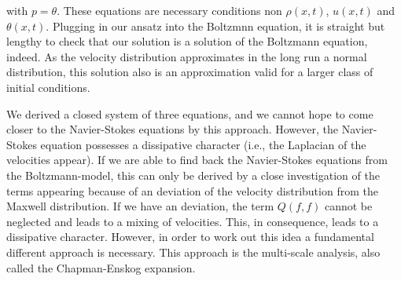 with $p = \theta$. 
 These equations
are necessary conditions non $\rho(x,t)$, $u(x,t)$ and $\theta(x,t)$. Plugging in our ansatz into the Boltzmnn equation, 
it is straight but lengthy to check that our solution is a solution of the Boltzmann equation, indeed. 
As the velocity distribution approximates in the long run a normal distribution, this solution also is an approximation valid for a larger class
of initial conditions. \par
We derived a closed system of three equations, and we cannot hope to come closer to the Navier-Stokes equations
by this approach. However, the Navier-Stokes equation possesses a dissipative character (i.e., the Laplacian of the 
velocities appear). If we are able to find back the Navier-Stokes equations from the Boltzmann-model, this can only be 
derived by a close investigation of the terms appearing because of an deviation of the velocity distribution from the 
Maxwell distribution. If we have an deviation, the term $Q(f,f)$ cannot be neglected and leads to a mixing of velocities.
This, in consequence, leads to a dissipative character. However, in order to work out this idea a fundamental different 
approach is necessary. This approach is the multi-scale analysis, also called
the Chapman-Enskog expansion.

